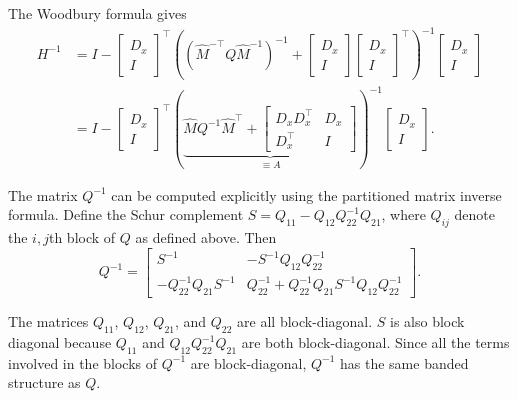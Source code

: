 \documentclass{article}
\begin{document}
The Woodbury formula gives
\begin{align}
    H^{-1} & = I -
    \begin{bmatrix}
        D_x \\ I
    \end{bmatrix}
    ^\top
    \left( \left(\hat{M}^{-\top} Q \hat{M}^{-1}\right)^{-1} +
    \begin{bmatrix}
        D_x \\ I
    \end{bmatrix}
    \begin{bmatrix}
        D_x \\ I
    \end{bmatrix}
    ^\top
    \right)^{-1}
    \begin{bmatrix}
        D_x \\ I
    \end{bmatrix}
    \nonumber      \\
    & = I -
    \begin{bmatrix}
        D_x \\ I
    \end{bmatrix}
    ^\top
    \left(\underbrace{
        \hat{M} Q^{-1} \hat{M}^\top
        +
        \begin{bmatrix}
            D_x D_x^\top & D_x \\
            D_x^\top     & I
        \end{bmatrix}
    }_{\equiv A}\right)^{-1}
    \begin{bmatrix}
        D_x \\ I
    \end{bmatrix}
    .
\end{align}

The matrix $Q^{-1}$ can be computed explicitly using the partitioned matrix
inverse formula. Define the Schur complement $S = Q_{11} - Q_{12} Q_{22}^{-1}
    Q_{21}$, where $Q_{ij}$ denote the $i,j$th block of $Q$ as defined above. Then
\begin{equation}
    Q^{-1} =
    \begin{bmatrix}
        S^{-1}                      & -S^{-1} Q_{12} Q_{22}^{-1}                                 \\
        - Q_{22}^{-1} Q_{21} S^{-1} & Q_{22}^{-1} + Q_{22}^{-1} Q_{21} S^{-1} Q_{12} Q_{22}^{-1}
    \end{bmatrix}
    .
\end{equation}

The matrices $Q_{11}$, $Q_{12}$, $Q_{21}$, and $Q_{22}$ are all block-diagonal.
$S$ is also block diagonal because $Q_{11}$ and $Q_{12} Q_{22}^{-1} Q_{21}$ are
both block-diagonal. Since all the terms involved in the blocks of $Q^{-1}$ are
block-diagonal, $Q^{-1}$ has the same banded structure as $Q$.
\end{document}
